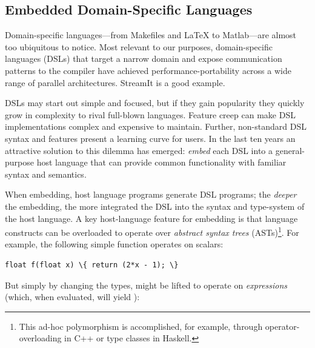 \subsection{Embedded Domain-Specific Languages}


Domain-specific languages---from Makefiles and \LaTeX{} to
Matlab---are almost too ubiquitous to notice.  Most relevant to our
purposes, domain-specific languages (DSLs) that target a narrow domain and expose communication
patterns to the compiler 
 have achieved performance-portability across a wide range of parallel
architectures.  
StreamIt is a good example.
% 

DSLs may start out simple and focused, but if they gain popularity
they quickly grow in complexity to rival full-blown languages.
Feature creep
can make DSL implementations complex and expensive to maintain.
Further, non-standard DSL syntax and features present a learning curve for users.  In the
last ten years an attractive solution to this dilemma has emerged: {\em
  embed} each DSL into a general-purpose host language that can provide
common functionality with familiar syntax and semantics.

When embedding, host language programs {generate} DSL programs;
the {\em deeper} the embedding, the more integrated the
DSL into the syntax and type-system of the host language.
%
A key host-language feature for embedding is that
language constructs can be overloaded to operate over {\em abstract
  syntax trees} (ASTs)\footnote{This ad-hoc polymorphism is accomplished,
for example, through operator-overloading in C++ or type classes in
Haskell.}.  For example, the following simple function operates on scalars:


\vspace{1mm}
\begin{Verbatim}[commandchars=\\\{\}]
  float f(float x) \{ return (2*x - 1); \}
\end{Verbatim}
\noindent
But simply by changing the types,  might be lifted to operate on {\em
  expressions} (which, when evaluated, will yield ):


